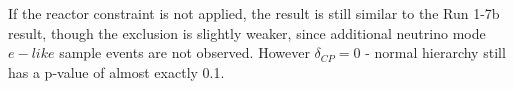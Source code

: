 
If the reactor constraint is not applied, the result is still similar to the Run 1-7b result,
though the exclusion is slightly weaker, since additional neutrino mode $e-like$ sample events are not observed.
However $\delta_{CP} = 0$ - normal hierarchy still has a p-value of almost exactly 0.1.


